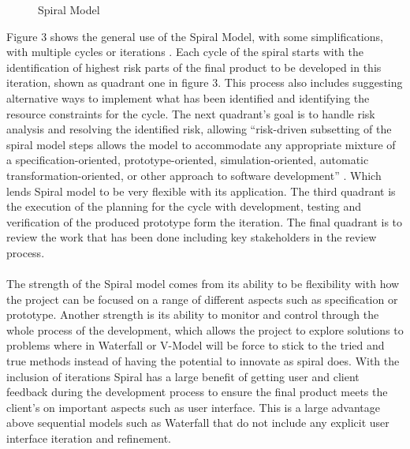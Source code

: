 \documentclass{style/CRPITStyle}
\renewcommand{\cite}{\citep}
\begin{document}
\vspace{.1in}
\begin{figure}[htb]
\caption{\protect\label{spiral}  Spiral Model}
\end{figure}

\vspace{.1in}

Figure 3 shows the general use of the Spiral Model, with some simplifications, 
with multiple cycles or iterations \cite{boehm:1988:spiral}.
Each cycle of the spiral starts with the identification of highest risk parts of the
final product to be developed in this iteration, shown as quadrant one in figure 3. 
This process also includes suggesting alternative ways to implement what
has been identified and
identifying the resource constraints for the cycle.
The next quadrant's goal is to handle risk analysis and resolving the identified
risk, allowing ``risk-driven subsetting of the spiral model steps allows the model 
to accommodate any appropriate mixture of a specification-oriented, 
prototype-oriented, simulation-oriented, automatic transformation-oriented, 
or other approach to software development'' \cite{boehm:1988:spiral}.
Which lends Spiral model to be very flexible with its application.
The third quadrant is the execution of the planning for the cycle with
development, testing and verification of the produced prototype form the
iteration. 
The final quadrant is to review the work that has been done including key
stakeholders in the review process.

\paragraph{}

The strength of the Spiral model comes from its ability to be
flexibility with how the project can be focused on a range of
different aspects such as specification or prototype.
Another strength is its ability to monitor and control through the whole process
of the development, which allows the project to explore solutions to problems
where in Waterfall or V-Model will be force to stick to the tried and true
methods instead of having the potential to innovate as spiral does.
With the inclusion of iterations Spiral has a large benefit of getting user and
client feedback during the development process to ensure the final product meets
the client's on important aspects such as user interface. This is a large
advantage above sequential models such as Waterfall that do not include any
explicit user interface iteration and refinement.
\end{document}
